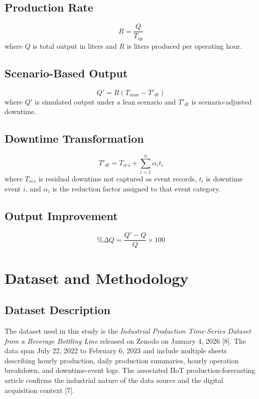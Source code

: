 \documentclass[journal]{IEEEtran}
\begin{document}
\subsection{Production Rate}
\begin{equation}
R = \frac{Q}{T_{op}}
\end{equation}
where $Q$ is total output in liters and $R$ is liters produced per operating hour.

\subsection{Scenario-Based Output}
\begin{equation}
Q' = R(T_{mon} - T'_{dt})
\end{equation}
where $Q'$ is simulated output under a lean scenario and $T'_{dt}$ is scenario-adjusted downtime.

\subsection{Downtime Transformation}
\begin{equation}
T'_{dt} = T_{res} + \sum_{i=1}^{n}\alpha_i t_i
\end{equation}
where $T_{res}$ is residual downtime not captured as event records, $t_i$ is downtime event $i$, and $\alpha_i$ is the reduction factor assigned to that event category.

\subsection{Output Improvement}
\begin{equation}
\%\Delta Q = \frac{Q' - Q}{Q}\times 100
\end{equation}

\section{Dataset and Methodology}
\subsection{Dataset Description}
The dataset used in this study is the \emph{Industrial Production Time-Series Dataset from a Beverage Bottling Line} released on Zenodo on January 4, 2026 [8]. The data span July 22, 2022 to February 6, 2023 and include multiple sheets describing hourly production, daily production summaries, hourly operation breakdown, and downtime-event logs. The associated IIoT production-forecasting article confirms the industrial nature of the data source and the digital acquisition context [7].
\end{document}
